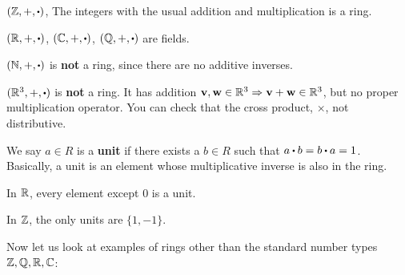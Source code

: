 \documentclass[../Main.tex]{subfiles}
\begin{document}
\begin{example}
	$(\Z,+,\rdot)$, The integers with the usual addition and multiplication is a ring.
\end{example}
\begin{example}
	$(\R, +, \rdot)$, $(\C, +, \rdot)$, $(\Q, +, \rdot)$ are fields.
\end{example}
\begin{example}
	$(\N, +, \rdot)$ is \textbf{not} a ring, since there are no additive inverses.
\end{example}
\begin{example}
	$(\R^3, +, \rdot)$ is \textbf{not} a ring. It has addition $\mathbf{v},\mathbf{w} \in \mathbb{R}^3 \Rightarrow \mathbf{v}+\mathbf{w} \in \mathbb{R}^3$, but no proper multiplication operator. You can check that the cross product, $\times$, not distributive.
\end{example}
\begin{dfn}[title= Unit]
	We say $a \in R$ is a \textbf{unit} if there exists a $ b \in R$ such that $a\rdot b=b\rdot a=1$. \newline Basically, a unit is an element whose multiplicative inverse is also in the ring.
\end{dfn}
\begin{example}
	In $\mathbb{R}$, every element except $0$ is a unit.
\end{example}
\begin{example}
	In $\mathbb{Z}$, the only units are $\{1,-1\}$.
\end{example}
Now let us look at examples of rings other than the standard number types $\mathbb{Z},\mathbb{Q},\mathbb{R},\mathbb{C}$:
\end{document}
